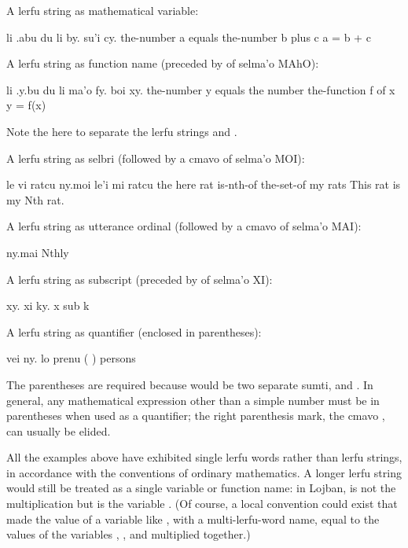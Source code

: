 A lerfu string as mathematical variable:
\begin{example}
li .abu du li by. su'i cy.\n
the-number a equals the-number b plus c\n
a = b + c
\end{example}

A lerfu string as function name (preceded by  of
    selma'o MAhO):
\begin{example}
li .y.bu du li ma'o fy. boi xy.\n
the-number y equals the number the-function f of x\n
y = f(x)
\end{example}

Note the  here to separate the lerfu strings 
    and .

A lerfu string as selbri (followed by a cmavo of selma'o
    MOI):
\begin{example}
le vi ratcu ny.moi le'i mi ratcu\n
the here rat is-nth-of the-set-of my rats\n
This rat is my Nth rat.
\end{example}

A lerfu string as utterance ordinal (followed by a cmavo of
    selma'o MAI):
\begin{example}
ny.mai\n
Nthly
\end{example}

A lerfu string as subscript (preceded by  of selma'o XI):
\begin{example}
xy. xi ky.\n
x sub k
\end{example}

A lerfu string as quantifier (enclosed in 
    parentheses):
\begin{example}
vei ny.  lo prenu\n
(  ) persons
\end{example}

The parentheses are required because  would be
    two separate sumti,  and . In general, any
    mathematical expression other than a simple number must be in
    parentheses when used as a quantifier; the right parenthesis
    mark, the cmavo , can usually be elided. 

All the examples above have exhibited single lerfu words
    rather than lerfu strings, in accordance with the conventions
    of ordinary mathematics. A longer lerfu string would still be
    treated as a single variable or function name: in Lojban,
     is not the multiplication  but is
    the variable . (Of course, a local convention could
    exist that made the value of a variable like , with a
    multi-lerfu-word name, equal to the values of the variables
    , , and  multiplied together.)

